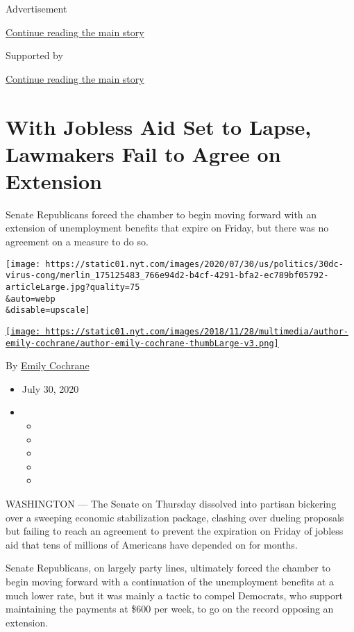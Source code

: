 Advertisement

\protect\hyperlink{after-top}{Continue reading the main story}

Supported by

\protect\hyperlink{after-sponsor}{Continue reading the main story}

\hypertarget{with-jobless-aid-set-to-lapse-lawmakers-fail-to-agree-on-extension}{%
\section{With Jobless Aid Set to Lapse, Lawmakers Fail to Agree on
Extension}\label{with-jobless-aid-set-to-lapse-lawmakers-fail-to-agree-on-extension}}

Senate Republicans forced the chamber to begin moving forward with an
extension of unemployment benefits that expire on Friday, but there was
no agreement on a measure to do so.

\texttt{[image: https://static01.nyt.com/images/2020/07/30/us/politics/30dc-virus-cong/merlin\_175125483\_766e94d2-b4cf-4291-bfa2-ec789bf05792-articleLarge.jpg?quality=75\\\&auto=webp\\\&disable=upscale]}

\href{https://www.nytimes.com/by/emily-cochrane}{\texttt{[image: https://static01.nyt.com/images/2018/11/28/multimedia/author-emily-cochrane/author-emily-cochrane-thumbLarge-v3.png]}}

By \href{https://www.nytimes.com/by/emily-cochrane}{Emily Cochrane}

\begin{itemize}
\item
  July 30, 2020
\item
  \begin{itemize}
  \item
  \item
  \item
  \item
  \item
  \end{itemize}
\end{itemize}

WASHINGTON --- The Senate on Thursday dissolved into partisan bickering
over a sweeping economic stabilization package, clashing over dueling
proposals but failing to reach an agreement to prevent the expiration on
Friday of jobless aid that tens of millions of Americans have depended
on for months.

Senate Republicans, on largely party lines, ultimately forced the
chamber to begin moving forward with a continuation of the unemployment
benefits at a much lower rate, but it was mainly a tactic to compel
Democrats, who support maintaining the payments at \$600 per week, to go
on the record opposing an extension.

